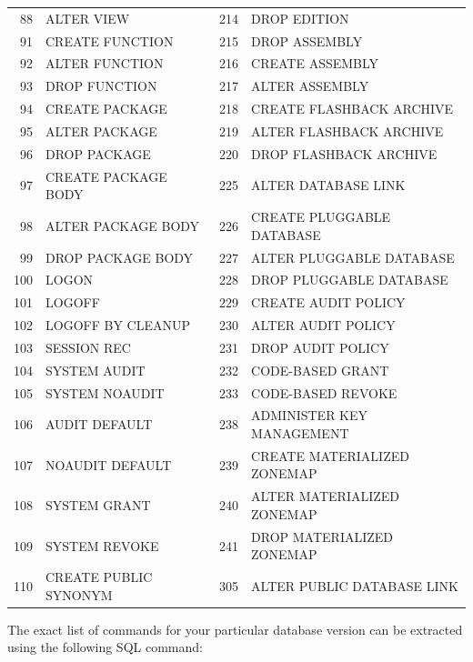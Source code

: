 \begin{appendix}
\begin{longtable}[]{@{}rl|rl@{}}
88   & ALTER VIEW                   & 214 & DROP EDITION                 \\
91   & CREATE FUNCTION              & 215 & DROP ASSEMBLY                \\
92   & ALTER FUNCTION               & 216 & CREATE ASSEMBLY              \\
93   & DROP FUNCTION                & 217 & ALTER ASSEMBLY               \\
94   & CREATE PACKAGE               & 218 & CREATE FLASHBACK ARCHIVE     \\
95   & ALTER PACKAGE                & 219 & ALTER FLASHBACK ARCHIVE      \\
96   & DROP PACKAGE                 & 220 & DROP FLASHBACK ARCHIVE       \\
97   & CREATE PACKAGE BODY          & 225 & ALTER DATABASE LINK          \\
98   & ALTER PACKAGE BODY           & 226 & CREATE PLUGGABLE DATABASE    \\
99   & DROP PACKAGE BODY            & 227 & ALTER PLUGGABLE DATABASE     \\
100  & LOGON                        & 228 & DROP PLUGGABLE DATABASE      \\
101  & LOGOFF                       & 229 & CREATE AUDIT POLICY          \\
102  & LOGOFF BY CLEANUP            & 230 & ALTER AUDIT POLICY           \\
103  & SESSION REC                  & 231 & DROP AUDIT POLICY            \\
104  & SYSTEM AUDIT                 & 232 & CODE-BASED GRANT             \\
105  & SYSTEM NOAUDIT               & 233 & CODE-BASED REVOKE            \\
106  & AUDIT DEFAULT                & 238 & ADMINISTER KEY MANAGEMENT    \\
107  & NOAUDIT DEFAULT              & 239 & CREATE MATERIALIZED ZONEMAP  \\
108  & SYSTEM GRANT                 & 240 & ALTER MATERIALIZED ZONEMAP   \\
109  & SYSTEM REVOKE                & 241 & DROP MATERIALIZED ZONEMAP    \\
110  & CREATE PUBLIC SYNONYM        & 305 & ALTER PUBLIC DATABASE LINK   \\

\bottomrule
\end{longtable}

The exact list of commands for your particular database version can be
extracted using the following SQL command:


\end{appendix}

